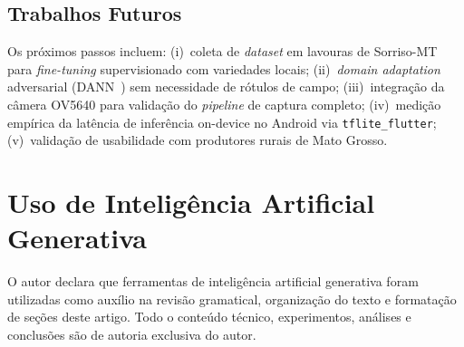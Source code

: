 \documentclass[12pt]{article}
\begin{document}
\subsection{Trabalhos Futuros}

Os próximos passos incluem: (i)~coleta de \textit{dataset} em lavouras de Sorriso-MT
para \textit{fine-tuning} supervisionado com variedades locais; (ii)~\textit{domain
adaptation} adversarial (DANN~\cite{ganin2016}) sem necessidade de rótulos de campo;
(iii)~integração da câmera OV5640 para validação do \textit{pipeline} de captura
completo;
(iv)~medição empírica da latência de inferência on-device no Android via
\texttt{tflite\_flutter}; (v)~validação de usabilidade com produtores rurais de
Mato Grosso.


\section*{Uso de Inteligência Artificial Generativa}

O autor declara que ferramentas de inteligência artificial generativa
foram utilizadas como auxílio na revisão gramatical, organização do
texto e formatação de seções deste artigo. Todo o conteúdo técnico,
experimentos, análises e conclusões são de autoria exclusiva do autor.



\end{document}
